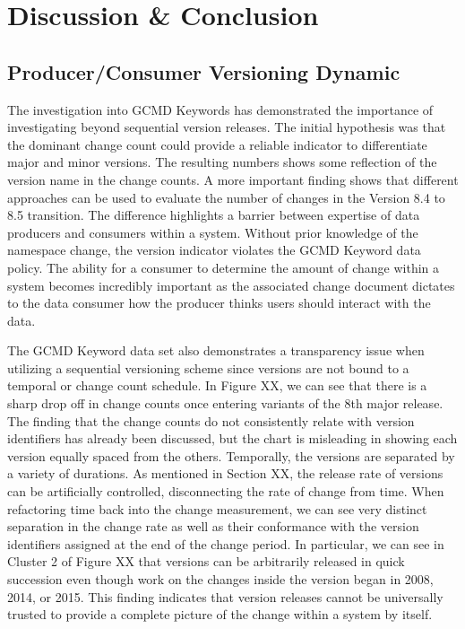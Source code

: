 \chapter{Discussion \& Conclusion}

\section{Producer/Consumer Versioning Dynamic}

The investigation into GCMD Keywords has demonstrated the importance of investigating beyond sequential version releases.  
The initial hypothesis was that the dominant change count could provide a reliable indicator to differentiate major and minor versions.  
The resulting numbers shows some reflection of the version name in the change counts.  
A more important finding shows that different approaches can be used to evaluate the number of changes in the Version 8.4 to 8.5 transition.  
The difference highlights a barrier between expertise of data producers and consumers within a system.  
Without prior knowledge of the namespace change, the version indicator violates the GCMD Keyword data policy.  
The ability for a consumer to determine the amount of change within a system becomes incredibly important as the associated change document dictates to the data consumer how the producer thinks users should interact with the data.

The GCMD Keyword data set also demonstrates a transparency issue when utilizing a sequential versioning scheme since versions are not bound to a temporal or change count schedule.  
In Figure XX, we can see that there is a sharp drop off in change counts once entering variants of the 8th major release.  
The finding that the change counts do not consistently relate with version identifiers has already been discussed, but the chart is misleading in showing each version equally spaced from the others.  
Temporally, the versions are separated by a variety of durations.  As mentioned in Section XX, the release rate of versions can be artificially controlled, disconnecting the rate of change from time.  
When refactoring time back into the change measurement, we can see very distinct separation in the change rate as well as their conformance with the version identifiers assigned at the end of the change period.  
In particular, we can see in Cluster 2 of Figure XX that versions can be arbitrarily released in quick succession even though work on the changes inside the version began in 2008, 2014, or 2015.  
This finding indicates that version releases cannot be universally trusted to provide a complete picture of the change within a system by itself.

